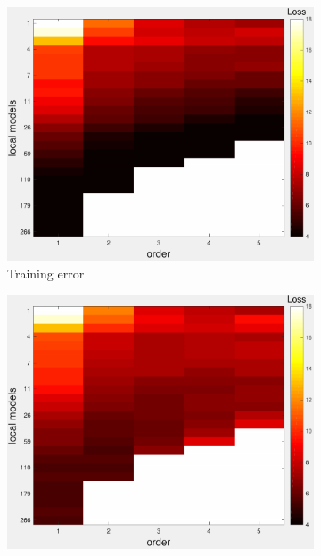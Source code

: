 \documentclass[letterpaper, 10 pt, conference]{ieeeconf}  %
\begin{document}
\blindtext[1]
 \begin{figure}[htpb]
        \centering
        \begin{subfigure}[b]{1in} 
                \centering
                \includegraphics[width=\textwidth]{figures/cross_allQP1.pdf}
                \caption{Training error}
                \label{fig:crossval_train}
        \end{subfigure}
                \begin{subfigure}[b]{1in} 
                \centering
                \includegraphics[width=\textwidth]{figures/cross_allQP2.pdf}

\end{subfigure}
\end{figure}
\end{document}
